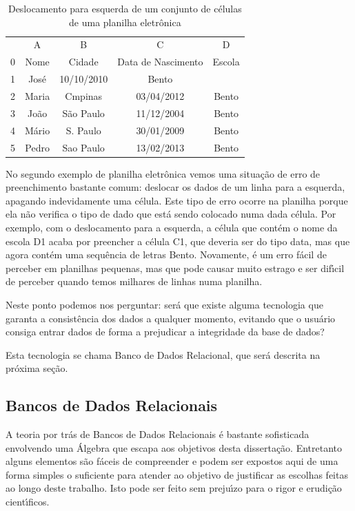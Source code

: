 \documentclass[
12pt,		%
openright,	%
twoside,  %
a4paper,			%
chapter=TITLE,		%
english,			%
french,				%
spanish,			%
brazil				%
]{USPSC-classe/USPSC}
\begin{document}
\begin{table}[htb]
\tiny
\caption{\label{f6feaa39313aa0691b7fdadc84175a203e68bf77}Deslocamento para esquerda de um conjunto de c\'elulas de uma planilha eletr\^onica}

\centering
\begin{tabular}{|c|c|c|c|c|}
\hline
  &  A  &  B  &  C  &  D  \\
0 & Nome  &  Cidade  &  Data de Nascimento  &  Escola \\
1 & Jos\'e  &  10/10/2010  &  Bento  &   \\
2 & Maria  &  Cmpinas  &  03/04/2012  &  Bento \\
3 & Jo\~ao  &  S\~ao Paulo  &  11/12/2004  &  Bento \\
4 & M\'ario  &  S. Paulo  &  30/01/2009  &  Bento \\
5 & Pedro  &  Sao Paulo  &  13/02/2013  &  Bento \\
\hline
\end{tabular}
\end{table}


No segundo exemplo de planilha eletr\^onica vemos uma situa\c{c}\~ao de erro de preenchimento bastante comum: deslocar os dados de um linha para a esquerda, apagando indevidamente uma c\'elula. Este tipo de erro ocorre na planilha porque ela n\~ao verifica o tipo de dado que est\'a sendo colocado numa dada c\'elula. Por exemplo, com o deslocamento para a esquerda, a c\'elula que cont\'em o nome da escola D1 acaba por preencher a c\'elula C1, que deveria ser do tipo data, mas que agora cont\'em uma sequ\^encia de letras \textquotedbl Bento\textquotedbl . Novamente, \'e um erro f\'acil de perceber em planilhas pequenas, mas que pode causar muito estrago e ser dif\'{\i}cil de perceber quando temos milhares de linhas numa planilha.


Neste ponto podemos nos perguntar: ser\'a que existe alguma tecnologia que garanta a consist\^encia dos dados a qualquer momento, evitando que o usu\'ario consiga entrar dados de forma a prejudicar a integridade da base de dados?


Esta tecnologia se chama \textquotedbl Banco de Dados Relacional\textquotedbl , que ser\'a descrita na pr\'oxima se\c{c}\~ao.


\subsection[Bancos de Dados Relacionais]{Bancos de Dados Relacionais}\label{Bancos de Dados Relacionais}
A teoria por tr\'as de Bancos de Dados Relacionais \'e bastante sofisticada envolvendo uma \'Algebra que escapa aos objetivos desta disserta\c{c}\~ao. Entretanto alguns elementos s\~ao f\'aceis de compreender e podem ser expostos aqui de uma forma simples o suficiente para atender ao objetivo de justificar as escolhas feitas ao longo deste trabalho. Isto pode ser feito sem preju\'{\i}zo para o rigor e erudi\c{c}\~ao cient\'{\i}ficos.
\end{document}

